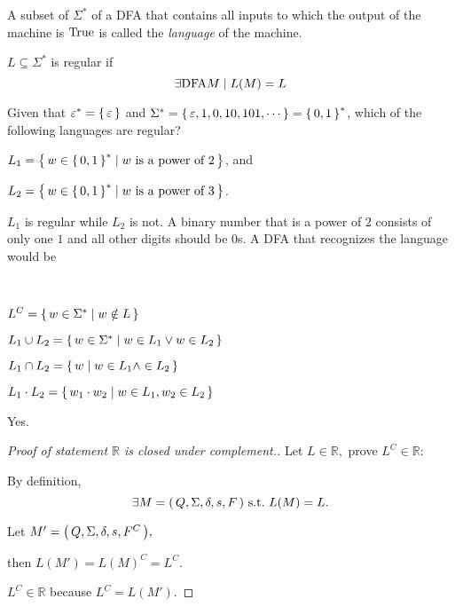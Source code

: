 
A subset of $\Sigma^*$ of a DFA that contains all inputs to which the output of the
machine is ${ \text{\upshape True} }$ is called the \emph{language} of the machine.

\begin{definition}
    $ L \subseteq \Sigma^* $
    is regular if
    \[
        \exists {\text{\upshape DFA} M} \mid L(M) = L
    \]
\end{definition}

\begin{example}[]
    Given that
    $\varepsilon^* = { \left\{\,\varepsilon\,\right\} }$
    and
    $\Sigma^* = { \left\{\,\varepsilon,1,0,10,101,\cdots\,\right\} } = { \left\{\,0,1\,\right\} }^*$,
    which of the following languages are regular?
    \begin{compactitem}
    \item
        $L_1 = { \left\{\, w \in { \left\{\,0,1\,\right\} }^* \mid w \text{ is a power of } 2\,\right\} }$, and
    \item
        $L_2 = { \left\{\, w \in { \left\{\,0,1\,\right\} }^* \mid w \text{ is a power of } 3\,\right\} }$.
    \end{compactitem}
    
    $L_1$ is regular while $L_2$ is not. A binary number that is a power of $2$ consists
    of only one $1$ and all other digits should be $0$s. A DFA that recognizes the
    language would be

\end{example}

\begin{definition} \ \\
    \begin{compactdesc}
    \item[Complement]
        $L^C = { \left\{\,w \in \Sigma^* \mid w \notin L\,\right\} }$
    \item[Union]
        $L_1 \cup L_2 = { \left\{\,w \in \Sigma^* \mid w \in L_1 \vee w \in L_2\,\right\} }$
    \item[Intersection]
        $L_1 \cap L_2 = { \left\{\,w \mid w \in L_1 \wedge \in L_2\,\right\} }$
    \item[Concatenation]
        $L_1 \cdot L_2 = { \left\{\,w_1 \cdot w_2 \mid w \in L_1, w_2 \in L_2\,\right\} }$
    \end{compactdesc}
\end{definition}

\begin{example}
    Yes.

    \begin{proof}[Proof of statement $\mathbb R$ is closed under complement.]
        Let $L \in \mathbb R,$
        prove $L^C \in \mathbb R:$

        By definition, 
        \[
            \exists \DFA \text{ s.t.\ } L(M) = L.
        \]

        Let $M' = { \left(\,Q,\Sigma,\delta,s,F^C\,\right) },$

        then $L(M') = L(M)^C = L^C.$

        $L^C \in \mathbb R$ because $L^C = L(M').$
    \end{proof}
\end{example}

